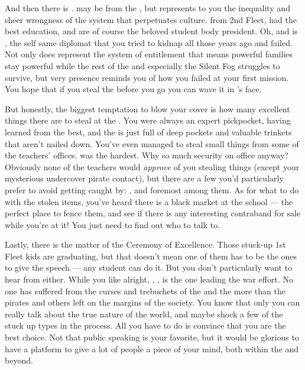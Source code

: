 \documentclass[char]{GL2020}
\begin{document}
And then there is \cPresident{\intro}. \cPresident{\They} may be from the \pShip{}, but represents to you the inequality and sheer wrongness of the system that perpetuates \pShippie{} culture. \cPresident{\Theyare} from 2nd Fleet, had the best education, and are of course the beloved student body president. Oh, and \cPresident{\their} \cPresident{\auncle} is \cHeadDiplomat{}, the self same diplomat that you tried to kidnap all those years ago and failed. Not only does \cPresident{} represent the system of entitlement that means powerful families stay powerful while the rest of the \pShip{} and especially the Silent Fog struggles to survive, but \cPresident{\their} very presence reminds you of how you failed at your first mission. You hope that if you steal the \iNet{} before you go you can wave it in \cPresident{}’s face. 

But honestly, the biggest temptation to blow your cover is how many excellent things there are to steal at the \pSc{}. You were always an expert pickpocket, having learned from the best, and the \pSc{} is just full of deep pockets and valuable trinkets that aren't nailed down. You've even managed to steal small things from some of the teachers' offices. \cChupInventor{\intro} was the hardest. Why \cChupInventor{\do} \cChupInventor{\theyhave} so much security on \cChupInventor{\their} office anyway? Obviously none of the teachers would \emph{approve} of you stealing things (except your mysterious undercover pirate contact), but there are a few you’d particularly prefer to avoid getting caught by: \cFlowPriest{}, \cInterpol{\intro} and \cPrincipal{\intro} foremost among them. As for what to do with the stolen items, you've heard there is a black market at the school — the perfect place to fence them, and see if there is any interesting contraband for sale while you're at it! You just need to find out who to talk to.

Lastly, there is the matter of the Ceremony of Excellence. Those stuck-up 1st Fleet kids are graduating, but that doesn't mean one of them has to be the ones to give the speech — any student can do it. But you don't particularly want to hear from \cWarlordDaughter{\intro} either. While you like \cWarlordDaughter{} alright, \cWarlordDaughter{\their} \cLoud{\parent}, \cLoud{\intro}, is the one leading the war effort. No one has suffered from the curses and trebuchets of the \pFarm{} and the \pTech{} more than the pirates and others left on the margins of the \pShip{} society. You know that only you can really talk about the true nature of the world, and maybe shock a few of the stuck up types in the process. All you have to do is convince \cMusic{\full} that you are the best choice. Not that public speaking is your favorite, but it would be glorious to have a platform to give a lot of people a piece of your mind, both within the \pShippies{} and beyond.
\end{document}
